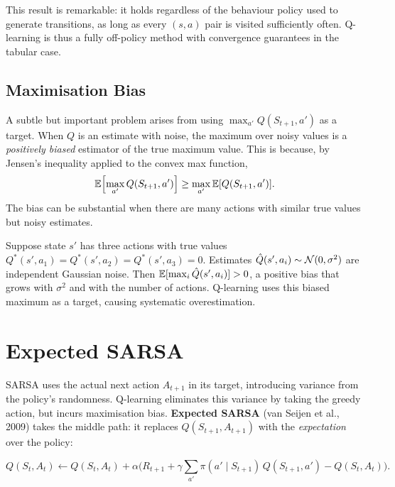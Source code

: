 This result is remarkable: it holds regardless of the behaviour policy used to generate transitions, as long as every $(s,a)$ pair is visited sufficiently often.  Q-learning is thus a fully off-policy method with convergence guarantees in the tabular case.

\subsection{Maximisation Bias}
\label{subsec:max-bias}

A subtle but important problem arises from using $\max_{a'} Q(S_{t+1},a')$ as a target.  When $Q$ is an estimate with noise, the maximum over noisy values is a \emph{positively biased} estimator of the true maximum value.  This is because, by Jensen's inequality applied to the convex max function,
\[
\operatorname{\mathbb{E}}\!\left[\max_{a'}Q(S_{t+1},a')\right] \ge \max_{a'}\operatorname{\mathbb{E}}[Q(S_{t+1},a')].
\]
The bias can be substantial when there are many actions with similar true values but noisy estimates.

\begin{example}
Suppose state $s'$ has three actions with true values $Q^*(s',a_1)=Q^*(s',a_2)=Q^*(s',a_3)=0$.  Estimates $\hat Q(s',a_i)\sim\mathcal{N}(0,\sigma^2)$ are independent Gaussian noise.  Then $\operatorname{\mathbb{E}}[\max_i\hat Q(s',a_i)] > 0$, a positive bias that grows with $\sigma^2$ and with the number of actions.  Q-learning uses this biased maximum as a target, causing systematic overestimation.
\end{example}

\section{Expected SARSA}
\label{sec:expected-sarsa}

SARSA uses the actual next action $A_{t+1}$ in its target, introducing variance from the policy's randomness.  Q-learning eliminates this variance by taking the greedy action, but incurs maximisation bias.  \textbf{Expected SARSA} (van Seijen et al., 2009) takes the middle path: it replaces $Q(S_{t+1},A_{t+1})$ with the \emph{expectation} over the policy:

\begin{equation}
\label{eq:expected-sarsa}
Q(S_t,A_t) \leftarrow Q(S_t,A_t) + \alpha\Biggl(R_{t+1} + \gamma\sum_{a'}\pi(a'\mid S_{t+1})\,Q(S_{t+1},a') - Q(S_t,A_t)\Biggr).
\end{equation}

